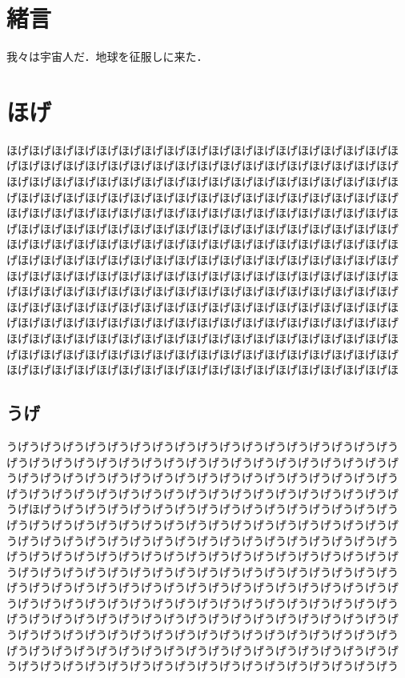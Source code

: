 \begin{small}

\section{緒言}
我々は宇宙人\cite{Hondo:hohoge2006}だ．地球を征服しに来た．

\section{ほげ}
ほげほげほげほげほげほげほげほげほげほげほげほげほげほげほげほげほげほ
げほげほげほげほげほげほげほげほげほげほげほげほげほげほげほげほげほげ
ほげほげほげほげほげほげほげほげほげほげほげほげほげほげほげほげほげほ
げほげほげほげほげほげほげほげほげほげほげほげほげほげほげほげほげほげ
ほげほげほげほげほげほげほげほげほげほげほげほげほげほげほげほげほげほ
げほげほげほげほげほげほげほげほげほげほげほげほげほげほげほげほげほげ
ほげほげほげほげほげほげほげほげほげほげほげほげほげほげほげほげほげほ
げほげほげほげほげほげほげほげほげほげほげほげほげほげほげほげほげほげ
ほげほげほげほげほげほげほげほげほげほげほげほげほげほげほげほげほげほ
げほげほげほげほげほげほげほげほげほげほげほげほげほげほげほげほげほげ
ほげほげほげほげほげほげほげほげほげほげほげほげほげほげほげほげほげほ
げほげほげほげほげほげほげほげほげほげほげほげほげほげほげほげほげほげ
ほげほげほげほげほげほげほげほげほげほげほげほげほげほげほげほげほげほ
げほげほげほげほげほげほげほげほげほげほげほげほげほげほげほげほげほげ
ほげほげほげほげほげほげほげほげほげほげほげほげほげほげほげほげほげほ

\subsection{うげ}
うげうげうげうげうげうげうげうげうげうげうげうげうげうげうげうげうげう
げうげうげうげうげうげうげうげうげうげうげうげうげうげうげうげうげうげ
うげうげうげうげうげうげうげうげうげうげうげうげうげうげうげうげうげう
げうげうげうげうげうげうげうげうげうげうげうげうげうげうげうげうげうげ
うげほげうげうげうげうげうげうげうげうげうげうげうげうげうげうげうげう
げうげうげうげうげうげうげうげうげうげうげうげうげうげうげうげうげうげ
うげうげうげうげうげうげうげうげうげうげうげうげうげうげうげうげうげう
げうげうげうげうげうげうげうげうげうげうげうげうげうげうげうげうげうげ
うげうげうげうげうげうげうげうげうげうげうげうげうげうげうげうげうげう
げうげうげうげうげうげうげうげうげうげうげうげうげうげうげうげうげうげ
うげうげうげうげうげうげうげうげうげうげうげうげうげうげうげうげうげう
げうげうげうげうげうげうげうげうげうげうげうげうげうげうげうげうげうげ
うげうげうげうげうげうげうげうげうげうげうげうげうげうげうげうげうげう
げうげうげうげうげうげうげうげうげうげうげうげうげうげうげうげうげうげ
うげうげうげうげうげうげうげうげうげうげうげうげうげうげうげうげうげう


\end{small}
